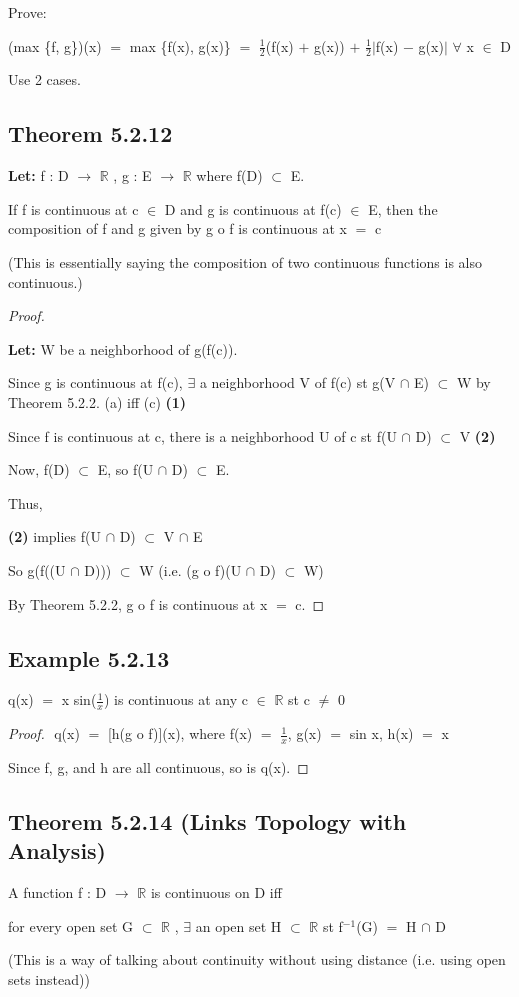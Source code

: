 \documentclass{article}
\newcommand{\mt}[1]{\ensuremath{#1}}
\newcommand\ssc[2][\DefaultOpt]{%
  \def\DefaultOpt{#2}%
  \subsection[#1]{#2}%
}
\newcommand{\bgpf}{\begin{proof} $ $\newline}
\newcommand{\lt}[1]{\textbf{Let: } #1}
\newcommand{\bpth}[1]{\textbf{(#1)}}
\newcommand{\epf}{\end{proof}}
\newcommand{\br}{\mt{\mathbb{R}} }       %
\newcommand{\fa}{\mt{\forall} }          %
\newcommand{\mem}{\mt{\in} }
\newcommand{\exs}{\mt{\exists} }
\newcommand{\sbs}{\mt{\subset} }         %
\newcommand{\lra}{ \mt{\longrightarrow} } %
\newcommand{\av}[1]{\mt{|}#1\mt{|}}  %
\newcommand{\bk}[1]{\{#1\}}
\newcommand{\ps}{\mt{+} }
\newcommand{\ms}{\mt{-} }
\newcommand{\eql}{\mt{=} }
\newcommand{\uf}[2]{#1\mt{^{#2}}}
\newcommand{\frc}[2]{\mt{\frac{#1}{#2}}}
\newcommand{\inn}{\mt{\cap} }
\newcommand\tab[1][1cm]{\hspace*{#1}}
\begin{document}
{{Prove:

(max \bk{f, g})(x) \eql max \bk{f(x), g(x)} \eql \frc{1}{2}(f(x) \ps g(x)) \ps \frc{1}{2}\av{f(x) \ms g(x)} \fa x \mem D

Use 2 cases.
}

\ssc{Theorem 5.2.12}{

\lt{f : D \lra \br, g : E \lra \br where f(D) \sbs E.}

If f is continuous at c \mem D and g is continuous at f(c) \mem E, then the composition of f and g given by g o f is continuous at x \eql c

(This is essentially saying the composition of two continuous functions is also continuous.)

\bgpf

\lt{W be a neighborhood of g(f(c)).}

Since g is continuous at f(c), \exs a neighborhood V of f(c) st 
g(V \inn E) \sbs W by Theorem 5.2.2. (a) iff (c) \bpth{1}

Since f is continuous at c, there is a neighborhood U of c st f(U \inn D) \sbs V \bpth{2}

Now, f(D) \sbs E, so f(U \inn D) \sbs E.

Thus,

\bpth{2} implies f(U \inn D) \sbs V \inn E

So g(f((U \inn D))) \sbs W (i.e. (g o f)(U \inn D) \sbs W)

By Theorem 5.2.2, g o f is continuous at x \eql c.

\epf
}

\ssc{Example 5.2.13}{

q(x) \eql x sin(\frc{1}{x}) is continuous at any c \mem \br st c $\neq$ 0

\bgpf
q(x) \eql [h(g o f)](x), where f(x) \eql \frc{1}{x}, \tab g(x) \eql sin x, \tab h(x) \eql x

Since f, g, and h are all continuous, so is q(x).
\epf
}

\ssc{Theorem 5.2.14 (Links Topology with Analysis)}{

A function f : D \lra \br is continuous on D iff 

for every open set G \sbs \br, \exs an open set H \sbs \br st \uf{f}{-1}(G) \eql H \inn D

(This is a way of talking about continuity without using distance (i.e. using open sets instead))
}
}
\end{document}
